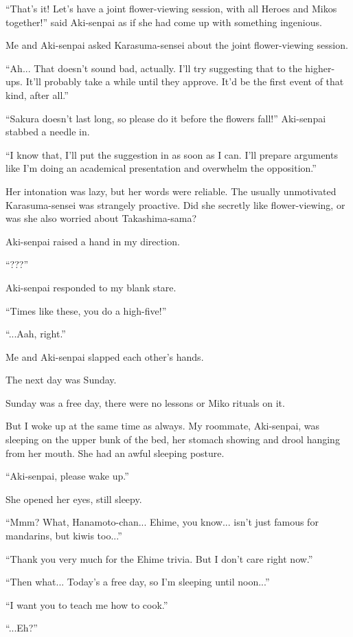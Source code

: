 ``That's it! Let's have a joint flower-viewing session, with all Heroes and Mikos together!'' said Aki-senpai as if she had come up with something ingenious.

Me and Aki-senpai asked Karasuma-sensei about the joint flower-viewing session.

``Ah... That doesn't sound bad, actually. I'll try suggesting that to the higher-ups. It'll probably take a while until they approve. It'd be the first event of that kind, after all.''

``Sakura doesn't last long, so please do it before the flowers fall!'' Aki-senpai stabbed a needle in.

``I know that, I'll put the suggestion in as soon as I can. I'll prepare arguments like I'm doing an academical presentation and overwhelm the opposition.''

Her intonation was lazy, but her words were reliable. The usually unmotivated Karasuma-sensei was strangely proactive. Did she secretly like flower-viewing, or was she also worried about Takashima-sama?

Aki-senpai raised a hand in my direction.

``???''

Aki-senpai responded to my blank stare.

``Times like these, you do a high-five!''

``...Aah, right.''

Me and Aki-senpai slapped each other's hands.

The next day was Sunday.

Sunday was a free day, there were no lessons or Miko rituals on it.

But I woke up at the same time as always. My roommate, Aki-senpai, was sleeping on the upper bunk of the bed, her stomach showing and drool hanging from her mouth. She had an awful sleeping posture.

``Aki-senpai, please wake up.''

She opened her eyes, still sleepy.

``Mmm? What, Hanamoto-chan... Ehime, you know... isn't just famous for mandarins, but kiwis too...''

``Thank you very much for the Ehime trivia. But I don't care right now.''

``Then what... Today's a free day, so I'm sleeping until noon...''

``I want you to teach me how to cook.''

``...Eh?''

